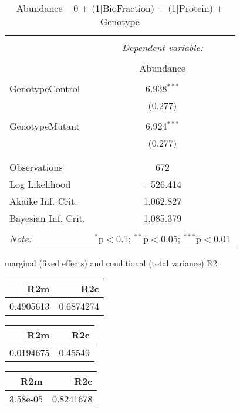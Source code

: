 \documentclass[11pt]{report}
\begin{document}
\begin{table}[!htbp] \centering 
  \caption{Abundance ~ 0 + (1|BioFraction) + (1|Protein) + Genotype} 
  \label{} 
\begin{tabular}{@{\extracolsep{5pt}}lc} 
\\[-1.8ex]\hline 
\hline \\[-1.8ex] 
 & \multicolumn{1}{c}{\textit{Dependent variable:}} \\ 
\cline{2-2} 
\\[-1.8ex] & Abundance \\ 
\hline \\[-1.8ex] 
 GenotypeControl & 6.938$^{***}$ \\ 
  & (0.277) \\ 
  & \\ 
 GenotypeMutant & 6.924$^{***}$ \\ 
  & (0.277) \\ 
  & \\ 
\hline \\[-1.8ex] 
Observations & 672 \\ 
Log Likelihood & $-$526.414 \\ 
Akaike Inf. Crit. & 1,062.827 \\ 
Bayesian Inf. Crit. & 1,085.379 \\ 
\hline 
\hline \\[-1.8ex] 
\textit{Note:}  & \multicolumn{1}{r}{$^{*}$p$<$0.1; $^{**}$p$<$0.05; $^{***}$p$<$0.01} \\ 
\end{tabular} 
\end{table} 
marginal (fixed effects) and conditional (total variance) R2:

\begin{tabular}{r|r}
\hline
R2m & R2c\\
\hline
0.4905613 & 0.6874274\\
\hline
\end{tabular}

\begin{tabular}{r|r}
\hline
R2m & R2c\\
\hline
0.0194675 & 0.45549\\
\hline
\end{tabular}

\begin{tabular}{r|r}
\hline
R2m & R2c\\
\hline
3.58e-05 & 0.8241678\\
\hline
\end{tabular}
\end{document}
